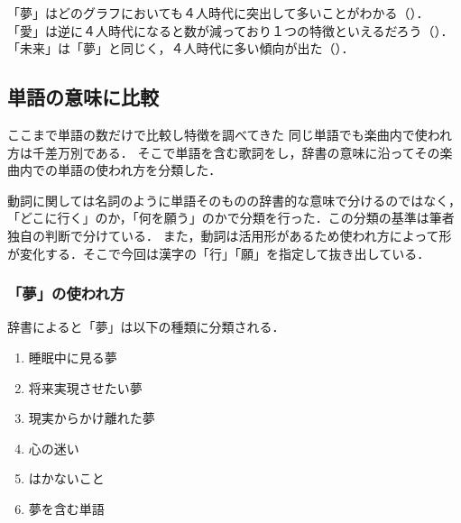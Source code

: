 「夢」はどのグラフにおいても４人時代に突出して多いことがわかる（）．
「愛」は逆に４人時代になると数が減っており１つの特徴といえるだろう（）．
「未来」は「夢」と同じく，４人時代に多い傾向が出た（）．

\subsection{単語の意味に比較}\label{sec:tangotyuumoku}
ここまで単語の数だけで比較し特徴を調べてきた
同じ単語でも楽曲内で使われ方は千差万別である．
そこで単語を含む歌詞をし，辞書の意味に沿ってその楽曲内での単語の使われ方を分類した．

%
動詞に関しては名詞のように単語そのものの辞書的な意味で分けるのではなく，「どこに行く」のか，「何を願う」のかで分類を行った．この分類の基準は筆者独自の判断で分けている．
また，動詞は活用形があるため使われ方によって形が変化する．そこで今回は漢字の「行」「願」を指定して抜き出している．








\subsubsection{「夢」の使われ方}
辞書によると「夢」は以下の種類に分類される\cite{yume}．

\begin{enumerate}
	\item 睡眠中に見る夢
	\item 将来実現させたい夢
	\item 現実からかけ離れた夢
	\item 心の迷い
	\item はかないこと
	\item 夢を含む単語
\end{enumerate}

